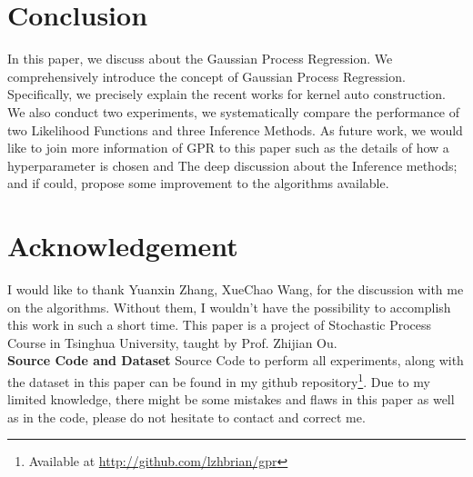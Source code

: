 \documentclass{sig-alternate-05-2015}
\newcommand{\para}[1]{{\vspace{2pt} \bf \noindent #1 \hspace{8pt}}}
\begin{document}











\section{Conclusion} \label{sec:conclusion}
In this paper, we discuss about the Gaussian Process Regression.
We comprehensively introduce the concept of Gaussian Process Regression.
Specifically, we precisely explain the recent works for kernel auto construction.
We also conduct two experiments, we systematically compare the performance of two Likelihood Functions and three Inference Methods. 
As future work, we would like to join more information of GPR to this paper such as the details of how a hyperparameter is chosen and The deep discussion about the Inference methods; and if could, propose some improvement to the algorithms available.


\renewcommand{\baselinestretch}{1.1}
\balance
\section{Acknowledgement} \label{sec:acknowledgement}
I would like to thank Yuanxin Zhang, XueChao Wang, for the discussion with me on the algorithms. Without them, I wouldn't have the possibility to accomplish this work in such a short time. This paper is a project of Stochastic Process Course in Tsinghua University, taught by Prof. Zhijian Ou.\\

\para{Source Code and Dataset} Source Code to perform all experiments, along with the dataset in this paper can be found in my github repository\footnote{Available at \color{blue}\href{http://github.com/lzhbrian/gpr}{http://github.com/lzhbrian/gpr}}. Due to my limited knowledge, there might be some mistakes and flaws in this paper as well as in the code, please do not hesitate to contact and correct me.




\end{document}
